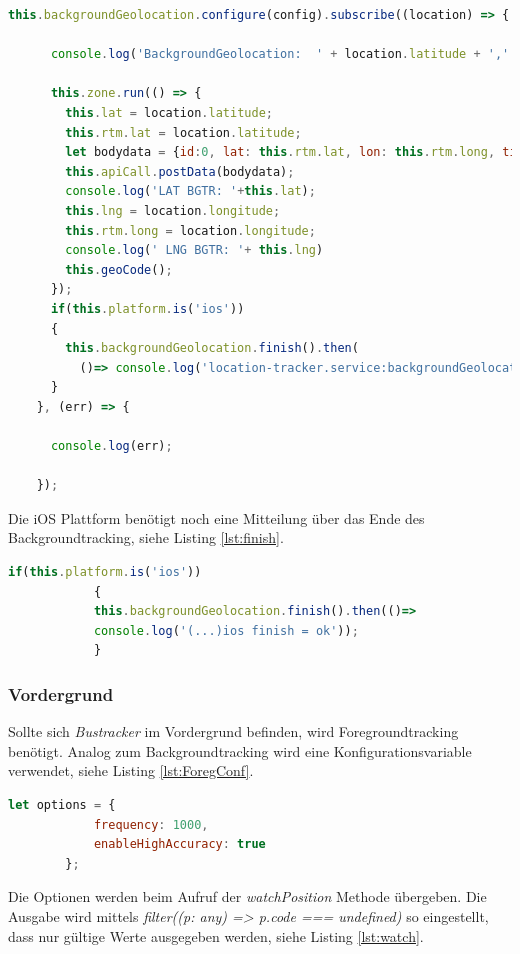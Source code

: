   \begin{lstlisting}[float, language=JavaScript, caption= Aktivierung Backgroundtracking, label=lst:BTAufruf] 
 this.backgroundGeolocation.configure(config).subscribe((location) => {

      console.log('BackgroundGeolocation:  ' + location.latitude + ',' + location.longitude);
      
      this.zone.run(() => {
        this.lat = location.latitude;
        this.rtm.lat = location.latitude;
        let bodydata = {id:0, lat: this.rtm.lat, lon: this.rtm.long, time: Date.now(), user_id: this.rtm.USER_ID, beacon_id: 0, beacon_active: true};
        this.apiCall.postData(bodydata);
        console.log('LAT BGTR: '+this.lat);
        this.lng = location.longitude;
        this.rtm.long = location.longitude;
        console.log(' LNG BGTR: '+ this.lng)
        this.geoCode();
      });
      if(this.platform.is('ios'))
      {
        this.backgroundGeolocation.finish().then(
          ()=> console.log('location-tracker.service:backgroundGeolocation.configure: ios finish = ok')); 
      }
    }, (err) => {

      console.log(err);

    });
\end{lstlisting}
Die iOS Plattform benötigt noch eine Mitteilung über das Ende des Backgroundtracking, siehe Listing \ref{lst:finish}.
\begin{lstlisting}[float, language= JavaScript, caption= finish()-Methode für iOS, label=lst:finish]
if(this.platform.is('ios'))
            {
            this.backgroundGeolocation.finish().then(()=> 
            console.log('(...)ios finish = ok'));
            }
\end{lstlisting}


\subsubsection*{Vordergrund}
Sollte sich \emph{Bustracker} im Vordergrund befinden, wird Foregroundtracking benötigt. Analog zum Backgroundtracking wird eine Konfigurationsvariable verwendet, siehe Listing \ref{lst:ForegConf}. 
\begin{lstlisting}[float, language=JavaScript, caption= Konfiguration Foregroundtracking, label=lst:ForegConf]
let options = {
            frequency: 1000,
            enableHighAccuracy: true
        };
\end{lstlisting}

Die Optionen werden beim Aufruf der \emph{watchPosition} Methode übergeben. Die Ausgabe wird mittels \emph{filter((p: any) => p.code === undefined)} so eingestellt, dass nur gültige Werte ausgegeben werden, siehe Listing \ref{lst:watch}.

